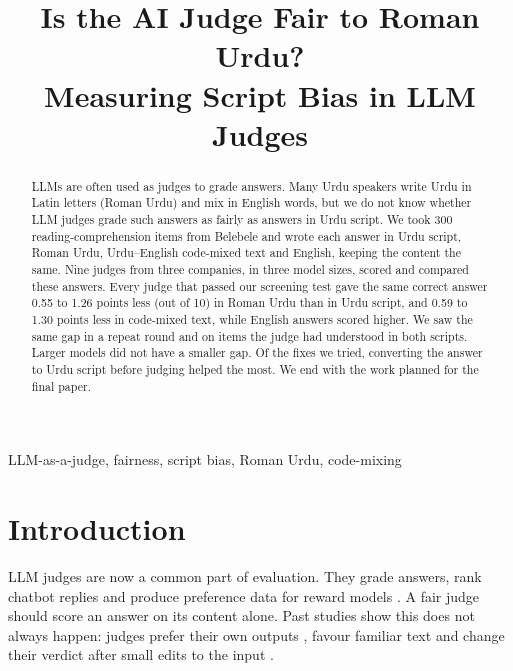 \documentclass[conference]{IEEEtran}
\begin{document}
\title{Is the AI Judge Fair to Roman Urdu?\\ Measuring Script Bias in LLM Judges}

\author{
}

\maketitle

\begin{abstract}
LLMs are often used as judges to grade answers. Many Urdu speakers write Urdu in Latin letters (Roman Urdu) and mix in
English words, but we do not know whether LLM judges grade such answers as fairly as answers in Urdu script. We took
300 reading-comprehension items from Belebele and wrote each answer in Urdu script, Roman Urdu, Urdu--English
code-mixed text and English, keeping the content the same. Nine judges from three companies, in three model sizes,
scored and compared these answers. Every judge that passed our screening test gave the same correct answer 0.55 to 1.26
points less (out of 10) in Roman Urdu than in Urdu script, and 0.59 to 1.30 points less in code-mixed text, while
English answers scored higher. We saw the same gap in a repeat round and on items the judge had understood in both
scripts. Larger models did not have a smaller gap. Of the fixes we tried, converting the answer to Urdu script before
judging helped the most. We end with the work planned for the final paper.
\end{abstract}

\begin{IEEEkeywords}
LLM-as-a-judge, fairness, script bias, Roman Urdu, code-mixing
\end{IEEEkeywords}

\section{Introduction}
LLM judges are now a common part of evaluation. They grade answers, rank chatbot replies and produce preference data
for reward models \cite{zheng2023judging}. A fair judge should score an answer on its content alone. Past studies
show this does not always happen: judges prefer their own outputs \cite{panickssery2024llm},
favour familiar text \cite{wataoka2024self} and change their verdict after small edits to the input
\cite{ye2025justice}.
\end{document}
